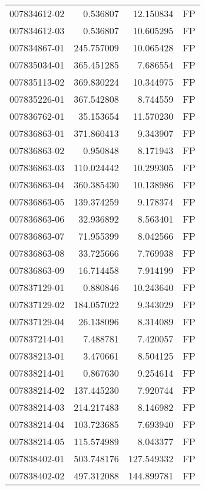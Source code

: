 \begin{tabular}{lrrl}
007834612-02 &    0.536807 &      12.150834 &   FP \\
007834612-03 &    0.536807 &      10.605295 &   FP \\
007834867-01 &  245.757009 &      10.065428 &   FP \\
007835034-01 &  365.451285 &       7.686554 &   FP \\
007835113-02 &  369.830224 &      10.344975 &   FP \\
007835226-01 &  367.542808 &       8.744559 &   FP \\
007836762-01 &   35.153654 &      11.570230 &   FP \\
007836863-01 &  371.860413 &       9.343907 &   FP \\
007836863-02 &    0.950848 &       8.171943 &   FP \\
007836863-03 &  110.024442 &      10.299305 &   FP \\
007836863-04 &  360.385430 &      10.138986 &   FP \\
007836863-05 &  139.374259 &       9.178374 &   FP \\
007836863-06 &   32.936892 &       8.563401 &   FP \\
007836863-07 &   71.955399 &       8.042566 &   FP \\
007836863-08 &   33.725666 &       7.769938 &   FP \\
007836863-09 &   16.714458 &       7.914199 &   FP \\
007837129-01 &    0.880846 &      10.243640 &   FP \\
007837129-02 &  184.057022 &       9.343029 &   FP \\
007837129-04 &   26.138096 &       8.314089 &   FP \\
007837214-01 &    7.488781 &       7.420057 &   FP \\
007838213-01 &    3.470661 &       8.504125 &   FP \\
007838214-01 &    0.867630 &       9.254614 &   FP \\
007838214-02 &  137.445230 &       7.920744 &   FP \\
007838214-03 &  214.217483 &       8.146982 &   FP \\
007838214-04 &  103.723685 &       7.693940 &   FP \\
007838214-05 &  115.574989 &       8.043377 &   FP \\
007838402-01 &  503.748176 &     127.549332 &   FP \\
007838402-02 &  497.312088 &     144.899781 &   FP \\

\end{tabular}
